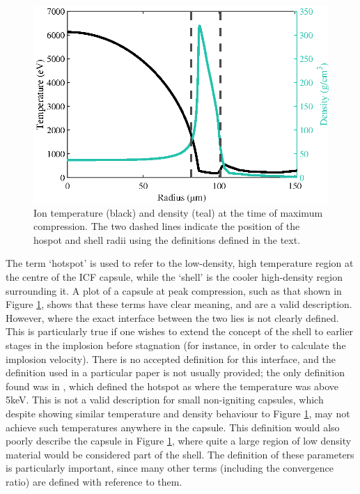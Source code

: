 \begin{figure}[ht]
	\centering
	\includegraphics{figures/LowCR/HSDefn.eps}
	\caption{Ion temperature (black) and density (teal) at the time of maximum compression. The two dashed lines indicate the position of the hospot and shell radii using the definitions defined in the text.}
	\label{fig:HsDefn}
\end{figure}

The term `hotspot' is used to refer to the low-density, high temperature region at the centre of the ICF capsule, while the `shell' is the cooler high-density region surrounding it. A plot of a capsule at peak compression, such as that shown in Figure \ref{fig:HsDefn}, shows that these terms have clear meaning, and are a valid description. However, where the exact interface between the two lies is not clearly defined. This is particularly true if one wishes to extend the concept of the shell to earlier stages in the implosion before stagnation (for instance, in order to calculate the implosion velocity). There is no accepted definition for this interface, and the definition used in a particular paper is not usually provided; the only definition found was in \cite{Olson2021}, which defined the hotspot as where the temperature was above 5keV. This is not a valid description for small non-igniting capsules, which despite showing similar temperature and density behaviour to Figure \ref{fig:HsDefn}, may not achieve such temperatures anywhere in the capsule. This definition would also poorly describe the capsule in Figure \ref{fig:HsDefn}, where quite a large region of low density material would be considered part of the shell. The definition of these parameters is particularly important, since many other terms (including the convergence ratio) are defined with reference to them.

